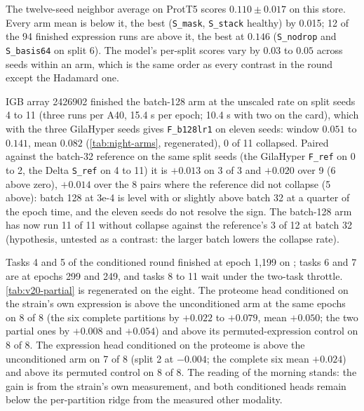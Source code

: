  The twelve-seed neighbor average on
ProtT5 scores $0.110 \pm 0.017$ on this store. Every arm mean is below it, the best
(\texttt{S\_mask}, \texttt{S\_stack} healthy) by 0.015; 12 of the 94 finished expression
runs are above it, the best at $0.146$ (\texttt{S\_nodrop} and \texttt{S\_basis64} on
split 6). The model's per-split scores vary by $0.03$ to $0.05$ across seeds within an arm,
which is the same order as every contrast in the round except the Hadamard one.

 IGB array 2426902 finished the batch-128 arm at the
unscaled rate on split seeds 4 to 11 (three runs per A40, 15.4 s per epoch; 10.4 s with two
on the card), which with the three GilaHyper seeds gives \texttt{F\_b128lr1} on eleven
seeds: window $0.051$ to $0.141$, mean $0.082$ (\cref{tab:night-arms}, regenerated), 0 of 11
collapsed. Paired against the batch-32 reference
on the same split seeds (the GilaHyper \texttt{F\_ref} on 0 to 2, the Delta \texttt{S\_ref}
on 4 to 11) it is $+0.013$ on 3 of 3 and $+0.020$ over 9 (6 above zero), $+0.014$ over the 8
pairs where the reference did not collapse (5 above): batch 128 at 3e-4 is level with or
slightly above batch 32 at a quarter of the epoch time, and the eleven seeds do not resolve
the sign. The batch-128 arm has now run 11 of 11 without collapse against the reference's
3 of 12 at batch 32 (hypothesis, untested as a contrast: the larger batch lowers the
collapse rate).

 Tasks 4 and 5 of the conditioned round finished at
epoch 1{,}199 on ; tasks 6 and 7 are at epochs 299 and 249, and tasks 8 to 11
wait under the two-task throttle. \cref{tab:v20-partial} is regenerated on the eight.
The proteome head conditioned on the strain's own expression is above the unconditioned
arm at the same epochs on 8 of 8 (the six complete partitions by $+0.022$ to $+0.079$,
mean $+0.050$; the two partial ones by $+0.008$ and $+0.054$) and above its
permuted-expression control on 8 of 8. The expression head conditioned on the proteome is
above the unconditioned arm on 7 of 8 (split 2 at $-0.004$; the complete six mean
$+0.024$) and above its permuted control on 8 of 8. The reading of the morning stands:
the gain is from the strain's own measurement, and both conditioned heads remain below
the per-partition ridge from the measured other modality.
